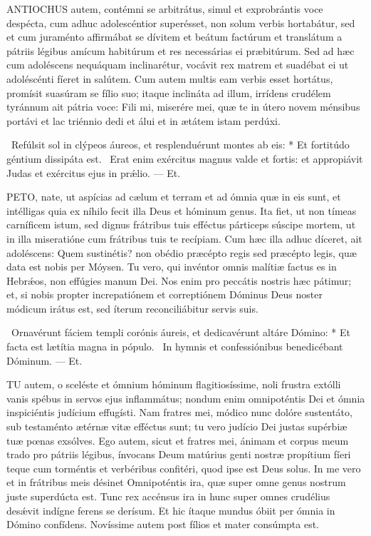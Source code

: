 \lettrine[lines=2]{A}{NTIOCHUS} autem, contémni se arbitrátus, simul et exprobrántis voce despécta, cum adhuc adolescéntior superésset, non solum verbis hortabátur, sed et cum juraménto affirmábat se dívitem et beátum factúrum et translátum a pátriis légibus amícum habitúrum et res necessárias ei præbitúrum. Sed ad hæc cum adoléscens nequáquam inclinarétur, vocávit rex matrem et suadébat ei ut adoléscénti fíeret in salútem. Cum autem multis eam verbis esset hortátus, promísit suasúram se fílio suo; itaque inclináta ad illum, irrídens crudélem tyránnum ait pátria voce: Fili mi, miserére mei, quæ te in útero novem ménsibus portávi et lac triénnio dedi et álui et in ætátem istam perdúxi.

\R\ Refúlsit sol in clýpeos áureos, et resplenduérunt montes ab eis: * Et fortitúdo géntium dissipáta est. \V\ Erat enim exércitus magnus valde et fortis: et appropiávit Judas et exércitus ejus in prǽlio. — Et.


\lettrine[lines=2]{P}{ETO}, nate, ut aspícias ad cælum et terram et ad ómnia quæ in eis sunt, et intélligas quia ex níhilo fecit illa Deus et hóminum genus. Ita fiet, ut non tímeas carníficem istum, sed dignus frátribus tuis efféctus párticeps súscipe mortem, ut in illa miseratióne cum frátribus tuis te recípiam. Cum hæc illa adhuc díceret, ait adoléscens: Quem sustinétis? non obédio præcépto regis sed præcépto legis, quæ data est nobis per Móysen. Tu vero, qui invéntor omnis malítiæ factus es in Hebrǽos, non effúgies manum Dei. Nos enim pro peccátis nostris hæc pátimur; et, si nobis propter increpatiónem et correptiónem Dóminus Deus noster módicum irátus est, sed íterum reconciliábitur servis suis.

\R\ Ornavérunt fáciem templi corónis áureis, et dedicavérunt altáre Dómino: * Et facta est lætítia magna in pópulo. \V\ In hymnis et confessiónibus benedicébant Dóminum. — Et.



\lettrine[lines=2]{T}{U} autem, o sceléste et ómnium hóminum flagitiosíssime, noli frustra extólli vanis spébus in servos ejus inflammátus; nondum enim omnipoténtis Dei et ómnia inspiciéntis judícium effugísti. Nam fratres mei, módico nunc dolóre sustentáto, sub testaménto ætérnæ vitæ efféctus sunt; tu vero judício Dei justas supérbiæ tuæ pœnas exsólves. Ego autem, sicut et fratres mei, ánimam et corpus meum trado pro pátriis légibus, ínvocans Deum matúrius genti nostræ propítium fíeri teque cum torméntis et verbéribus confitéri, quod ipse est Deus solus. In me vero et in frátribus meis désinet Omnipoténtis ira, quæ super omne genus nostrum juste superdúcta est. Tunc rex accénsus ira in hunc super omnes crudélius desǽvit indígne ferens se derísum. Et hic ítaque mundus óbiit per ómnia in Dómino confídens. Novíssime autem post fílios et mater consúmpta est.

